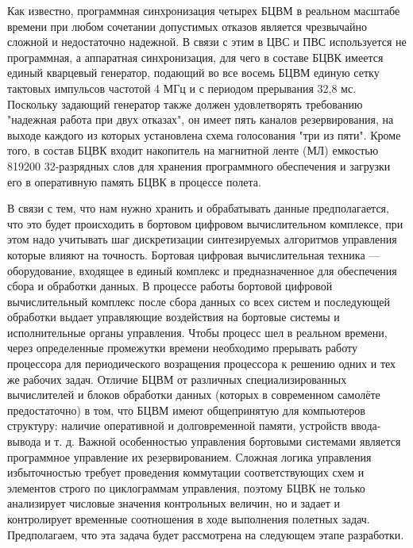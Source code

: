 Как известно, программная синхронизация четырех БЦВМ в реальном масштабе времени при любом сочетании допустимых отказов является чрезвычайно сложной и недостаточно надежной. В связи с этим в ЦВС и ПВС используется не программная, а аппаратная синхронизация, для чего в составе БЦВК имеется единый кварцевый генератор, подающий во все восемь БЦВМ единую сетку тактовых импульсов частотой 4 МГц и с периодом прерывания 32,8 мс. Поскольку задающий генератор также должен удовлетворять требованию "надежная работа при двух отказах", он имеет пять каналов резервирования, на выходе каждого из которых установлена схема голосования "три из пяти". Кроме того, в состав БЦВК входит накопитель на магнитной ленте (МЛ) емкостью 819200 32-разрядных слов для хранения программного обеспечения и загрузки его в оперативную память БЦВК в процессе полета.

В связи с тем, что нам нужно хранить и обрабатывать данные предполагается, что это будет происходить в бортовом цифровом вычислительном комплексе, при этом надо учитывать шаг дискретизации синтезируемых алгоритмов управления которые влияют на точность. Бортовая цифровая вычислительная техника — оборудование, входящее в единый комплекс и предназначенное для обеспечения сбора и обработки данных. В процессе работы бортовой цифровой вычислительный комплекс после сбора данных со всех систем и последующей обработки выдает управляющие воздействия на бортовые системы и исполнительные органы управления. Чтобы процесс шел в реальном времени, через определенные промежутки времени необходимо прерывать работу процессора для периодического возращения процессора к решению одних и тех же рабочих задач. Отличие БЦВМ от различных специализированных вычислителей и блоков обработки данных (которых в современном самолёте предостаточно) в том, что БЦВМ имеют общепринятую для компьютеров структуру: наличие оперативной и долговременной памяти, устройств ввода-вывода и т. д. Важной особенностью управления бортовыми системами является программное управление их резервированием. Сложная логика управления избыточностью требует проведения коммутации соответствующих схем и элементов строго по циклограммам управления, поэтому БЦВК не только анализирует числовые значения контрольных величин, но и задает и контролирует временные соотношения в ходе выполнения полетных задач. Предполагаем, что эта задача будет рассмотрена на следующем этапе разработки.
\clearpage